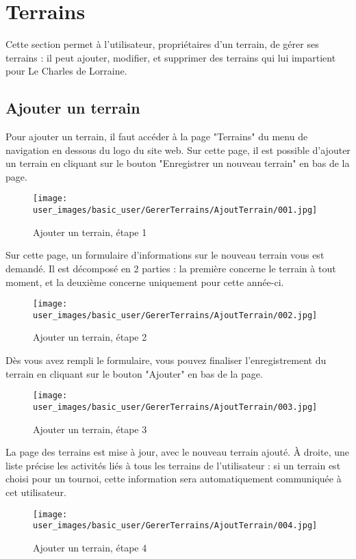\section{Terrains}

Cette section permet à l'utilisateur, propriétaires d'un terrain, de gérer ses terrains : il peut ajouter, modifier, et supprimer des terrains qui lui impartient pour Le Charles de Lorraine.

\subsection{Ajouter un terrain}

Pour ajouter un terrain, il faut accéder à la page "Terrains" du menu de navigation en dessous du logo du site web. Sur cette page, il est possible d'ajouter un terrain en cliquant sur le bouton "Enregistrer un nouveau terrain" en bas de la page.

\begin{figure}[H]
\centering
\texttt{[image: user\_images/basic\_user/GererTerrains/AjoutTerrain/001.jpg]}
\caption{Ajouter un terrain, étape 1}
\end{figure}

Sur cette page, un formulaire d'informations sur le nouveau terrain vous est demandé. Il est décomposé en 2 parties : la première concerne le terrain à tout moment, et la deuxième concerne uniquement pour cette année-ci.

\begin{figure}[H]
\centering
\texttt{[image: user\_images/basic\_user/GererTerrains/AjoutTerrain/002.jpg]}
\caption{Ajouter un terrain, étape 2}
\end{figure}

Dès vous avez rempli le formulaire, vous pouvez finaliser l'enregistrement du terrain en cliquant sur le bouton "Ajouter" en bas de la page.

\begin{figure}[H]
\centering
\texttt{[image: user\_images/basic\_user/GererTerrains/AjoutTerrain/003.jpg]}
\caption{Ajouter un terrain, étape 3}
\end{figure}

La page des terrains est mise à jour, avec le nouveau terrain ajouté. À droite, une liste précise les activités liés à tous les terrains de l'utilisateur : si un terrain est choisi pour un tournoi, cette information sera automatiquement communiquée à cet utilisateur. 

\begin{figure}[H]
\centering
\texttt{[image: user\_images/basic\_user/GererTerrains/AjoutTerrain/004.jpg]}
\caption{Ajouter un terrain, étape 4}
\end{figure}

